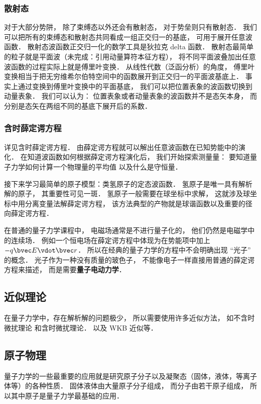 \subsubsection{散射态}
对于大部分势阱， 除了束缚态以外还会有散射态， 对于势垒则只有散射态． 我们可以把所有的束缚态和散射态共同看成一组正交归一的基底， 可用于展开任意波函数． 散射态波函数正交归一化的数学工具是狄拉克 delta 函数． 散射态最简单的粒子就是平面波（未完成：引用动量算符本征方程）， 将不同平面波叠加出任意波函数的过程实际上就是傅里叶变换． 从线性代数（泛函分析）的角度， 傅里叶变换相当于把无穷维希尔伯特空间中的函数展开到正交归一的平面波基底上． 事实上通过变换到傅里叶变换中的平面基底， 我们可以把位置表象的波函数切换到动量表象． 我们可以认为： 位置表象或者动量表象的波函数并不是态矢本身， 而分别是态矢在两组不同的基底下展开后的系数．

\subsubsection{含时薛定谔方程}
详见含时薛定谔方程． 由薛定谔方程就可以解出任意波函数在已知势能中的演化． 在知道波函数如何根据薛定谔方程演化后， 我们开始探索测量量： 要知道量子力学如何计算一个物理量的平均值 以及什么是守恒量．

接下来学习最简单的原子模型：类氢原子的定态波函数． 氢原子是唯一具有解析解的原子， 其重要性可见一斑． 氢原子一般需要在球坐标中求解， 这就涉及球坐标中用分离变量法解薛定谔方程， 该方法典型的产物就是球谐函数以及重要的径向薛定谔方程．

在普通的量子力学课程中， 电磁场通常是不进行量子化的， 他们仍然是电磁学中的连续场． 例如一个恒电场在薛定谔方程中体现为在势能项中加上 $-q\bvec E \vdot \bvec r$． 所以在经典的量子力学的方程中不会明确出现 “光子” 的概念． 光子作为一种没有质量的玻色子， 不能像电子一样直接用普通的薛定谔方程来描述， 而是需要\textbf{量子电动力学}．

\subsection{近似理论}
在量子力学中，存在解析解的问题极少， 所以需要使用许多近似方法， 如不含时微扰理论 和含时微扰理论． 以及 WKB 近似等．

\subsection{原子物理}
量子力学的一些最重要的应用就是研究原子分子以及凝聚态（固体，液体，等离子体等）的各种性质． 固体液体由大量原子分子组成， 而分子由若干原子组成， 所以其中原子是量子力学最基础的应用．

